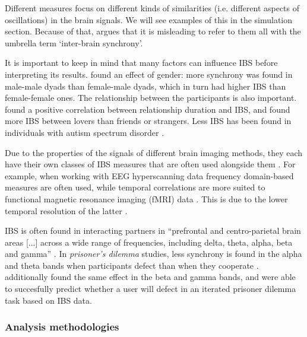 Different measures focus on different kinds of similarities
(i.e. different aspects of oscillations) in the brain signals. We will see
examples of this in the simulation section. Because of that,
\textcite{czeszumski_hyperscanning_2020} argues that it is misleading to refer
to them all with the umbrella term `inter-brain synchrony'.

It is important to keep in mind that many factors can influence IBS before
interpreting its results. \textcite{cheng_synchronous_2015} found
an effect of gender: more synchrony was found in male-male dyads than
female-male dyads, which in turn had higher IBS than female-female ones.
The relationship between the participants is also important.
\textcite{dikker_crowdsourcing_2021} found a positive correlation between
relationship duration and IBS, and \textcite{pan_cooperation_2017} found more
IBS between lovers than friends or strangers. Less IBS has been found in
individuals with    autism spectrum disorder
\parencite[ASD;][]{salmi_brains_2013,valencia_what_2020}.

Due to the properties of the signals of different brain imaging methods,
they each have their own classes of IBS measures that are often used alongside
them \parencite{babiloni_social_2014}. For example, when working with
EEG hyperscanning data frequency domain-based measures are often used, while
temporal correlations are more suited to functional magnetic resonance imaging
(fMRI) data \parencite{babiloni_social_2014}. This is due to the lower temporal
resolution of the latter \parencite{czeszumski_hyperscanning_2020}.

IBS is often found in interacting
partners in ``prefrontal and centro-parietal brain areas [...] across a wide
range of frequencies, including delta, theta, alpha, beta and gamma''
\parencite{konvalinka_two-brain_2012}. In \textit{prisoner's dilemma} studies,
less synchrony is found in the alpha and theta bands when participants defect
than when they cooperate \parencite{valencia_what_2020,hu_inter-brain_2018,de_vico_fallani_defecting_2010}.
\citeauthor{de_vico_fallani_defecting_2010} additionally found the same effect
in the beta and gamma bands, and were able to succesfully predict whether a user
will defect in an iterated prisoner dilemma task based on IBS data.

\subsubsection{Analysis methodologies}

